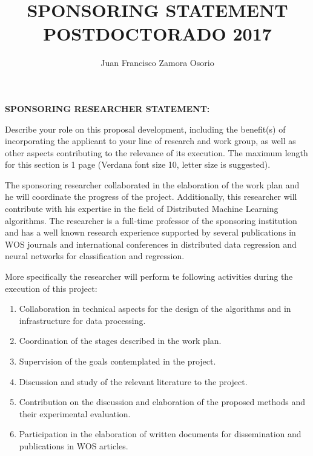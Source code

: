 \documentclass[10pt]{article}
\author{Juan Francisco Zamora Osorio}
\title{SPONSORING STATEMENT POSTDOCTORADO 2017}
\begin{document}
\noindent \textbf{SPONSORING RESEARCHER STATEMENT:}

\vspace{15pt}
\noindent Describe your role on this proposal development, including the benefit(s) of incorporating the applicant to your line of research and work group, as well as other aspects contributing to the relevance of its execution. The maximum length for this section is 1 page (Verdana font size 10, letter size is suggested).


The sponsoring researcher collaborated in the elaboration of the work plan and he will coordinate the progress of the project. Additionally, this researcher will contribute with his expertise in the field of Distributed Machine Learning algorithms. The researcher is a full-time professor of the sponsoring institution and has a well known research experience supported by several publications in WOS journals and international conferences in distributed data regression
and neural networks for classification and regression.

More specifically the researcher will perform te following activities during the execution of this project:
\begin{enumerate}
\item %
    Collaboration in technical aspects for the design of the algorithms and in infrastructure for data processing.
\item %
    Coordination of the stages described in the work plan.
\item %
    Supervision of the goals contemplated in the project.
\item %
    Discussion and study of the relevant literature to the project.
\item %
    Contribution on the discussion and elaboration of the proposed methods and their experimental evaluation.
\item %
    Participation in the elaboration of written documents for dissemination and publications in WOS articles.
\end{enumerate}
\end{document}
